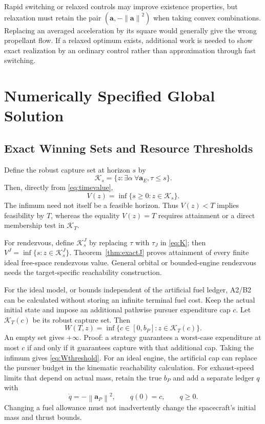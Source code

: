 \documentclass[journal,a4paper]{IEEEtran}
\newcommand{\norm}[1]{\left\|#1\right\|}
\begin{document}
Rapid switching or relaxed controls may improve existence properties, but relaxation must retain the pair $(\mathbf a,-\norm{\mathbf a}^2)$ when taking convex combinations. Replacing an averaged acceleration by its square would generally give the wrong propellant flow. If a relaxed optimum exists, additional work is needed to show exact realization by an ordinary control rather than approximation through fast switching.

\section{Numerically Specified Global Solution}
\label{sec:numerical}
\subsection{Exact Winning Sets and Resource Thresholds}
Define the robust capture set at horizon $s$ by
\begin{equation}
 \mathcal K_s=\{z:\exists\alpha\ \forall\mathbf a_E,
                                     \tau\le s\}.
 \label{eq:K}
\end{equation}
Then, directly from \eqref{eq:timevalue},
\begin{equation}
 \boxed{V(z)=\inf\{s\ge0:z\in\mathcal K_s\}.}
 \label{eq:VfromK}
\end{equation}
The infimum need not itself be a feasible horizon. Thus $V(z)<T$ implies feasibility by $T$, whereas the equality $V(z)=T$ requires attainment or a direct membership test in $\mathcal K_T$.

For rendezvous, define $\mathcal K_s^J$ by replacing $\tau$ with $\tau_J$ in \eqref{eq:K}; then $V^J=\inf\{s:z\in\mathcal K_s^J\}$. Theorem~\ref{thm:exactJ} proves attainment of every finite ideal free-space rendezvous value. General orbital or bounded-engine rendezvous needs the target-specific reachability construction.

For the ideal model, or bounds independent of the artificial fuel ledger, A2/B2 can be calculated without storing an infinite terminal fuel cost. Keep the actual initial state and impose an additional pathwise pursuer expenditure cap $c$. Let $\mathcal K_T(c)$ be its robust capture set. Then
\begin{equation}
 \boxed{W(T,z)=\inf\{c\in[0,b_P]:z\in\mathcal K_T(c)\}.}
 \label{eq:Wthreshold}
\end{equation}
An empty set gives $+\infty$. Proof: a strategy guarantees a worst-case expenditure at most $c$ if and only if it guarantees capture with that additional cap. Taking the infimum gives \eqref{eq:Wthreshold}. For an ideal engine, the artificial cap can replace the pursuer budget in the kinematic reachability calculation. For exhaust-speed limits that depend on actual mass, retain the true $b_P$ and add a separate ledger $q$ with
\begin{equation}
 \dot q=-\norm{\mathbf a_P}^2,\qquad q(0)=c,\qquad q\ge0.
\end{equation}
Changing a fuel allowance must not inadvertently change the spacecraft's initial mass and thrust bounds.
\end{document}
